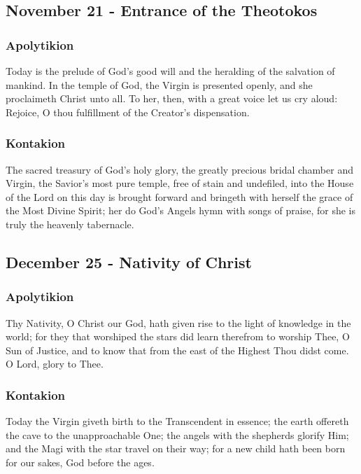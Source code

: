\subsection{November 21 - Entrance of the Theotokos}

\subsubsection{Apolytikion}

 Today is the prelude of God's good will and the heralding of the salvation of mankind. In the temple of God, the Virgin is presented openly, and she proclaimeth Christ unto all. To her, then, with a great voice let us cry aloud: Rejoice, O thou fulfillment of the Creator's dispensation.

\subsubsection{Kontakion}

 The sacred treasury of God's holy glory, the greatly precious bridal chamber and Virgin, the Savior's most pure temple, free of stain and undefiled, into the House of the Lord on this day is brought forward and bringeth with herself the grace of the Most Divine Spirit; her do God's Angels hymn with songs of praise, for she is truly the heavenly tabernacle.

\subsection{December 25 - Nativity of Christ}

\subsubsection{Apolytikion}

 Thy Nativity, O Christ our God, hath given rise to the light of knowledge in the world; for they that worshiped the stars did learn therefrom to worship Thee, O Sun of Justice, and to know that from the east of the Highest Thou didst come. O Lord, glory to Thee.

\subsubsection{Kontakion}

 Today the Virgin giveth birth to the Transcendent in essence; the earth offereth the cave to the unapproachable One; the angels with the shepherds glorify Him; and the Magi with the star travel on their way; for a new child hath been born for our sakes, God before the ages.

